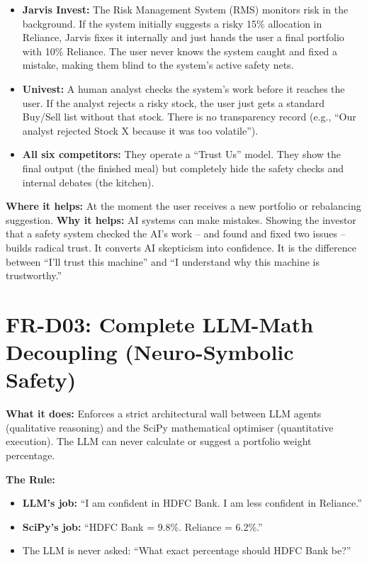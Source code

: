 \documentclass[12pt, a4paper, openany, oneside]{report}
\begin{document}
\begin{gapbox}
\begin{itemize}[noitemsep]
  \item \textbf{Jarvis Invest:} The Risk Management System (RMS) monitors risk in the background. If the system initially suggests a risky 15\% allocation in Reliance, Jarvis fixes it internally and just hands the user a final portfolio with 10\% Reliance. The user never knows the system caught and fixed a mistake, making them blind to the system's active safety nets.
  \item \textbf{Univest:} A human analyst checks the system's work before it reaches the user. If the analyst rejects a risky stock, the user just gets a standard Buy/Sell list without that stock. There is no transparency record (e.g., ``Our analyst rejected Stock X because it was too volatile'').
  \item \textbf{All six competitors:} They operate a ``Trust Us'' model. They show the final output (the finished meal) but completely hide the safety checks and internal debates (the kitchen).
\end{itemize}
\end{gapbox}

\begin{valuebox}
\textbf{Where it helps:} At the moment the user receives a new portfolio or rebalancing suggestion. \textbf{Why it helps:} AI systems can make mistakes. Showing the investor that a safety system checked the AI's work -- and found and fixed two issues -- builds radical trust. It converts AI skepticism into confidence. It is the difference between ``I'll trust this machine'' and ``I understand why this machine is trustworthy.''
\end{valuebox}

\section{FR-D03: Complete LLM-Math Decoupling (Neuro-Symbolic Safety)}

\textbf{What it does:} Enforces a strict architectural wall between LLM agents (qualitative reasoning) and the SciPy mathematical optimiser (quantitative execution). The LLM can never calculate or suggest a portfolio weight percentage.

\textbf{The Rule:}
\begin{itemize}
  \item \textbf{LLM's job:} ``I am confident in HDFC Bank. I am less confident in Reliance.''
  \item \textbf{SciPy's job:} ``HDFC Bank = 9.8\%. Reliance = 6.2\%.''
  \item The LLM is never asked: ``What exact percentage should HDFC Bank be?''
\end{itemize}
\end{document}
